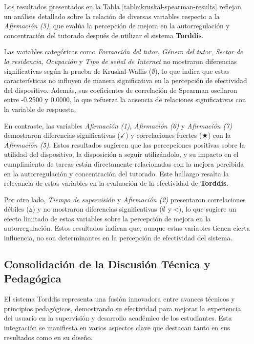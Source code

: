 \documentclass[a4paper,fleqn]{cas-sc}
\begin{document}
				Los resultados presentados en la Tabla \ref{table:kruskal-spearman-results} reflejan un análisis detallado sobre la relación de diversas variables respecto a la \textit{Afirmación (5)}, que evalúa la percepción de mejora en la autorregulación y concentración del tutorado después de utilizar el sistema \textbf{Torddis}.
				
				Las variables categóricas como \textit{Formación del tutor}, \textit{Género del tutor}, \textit{Sector de la residencia}, \textit{Ocupación} y \textit{Tipo de señal de Internet} no mostraron diferencias significativas según la prueba de Kruskal-Wallis (\(\emptyset\)), lo que indica que estas características no influyen de manera significativa en la percepción de efectividad del dispositivo. Además, sus coeficientes de correlación de Spearman oscilaron entre -0.2500 y 0.0000, lo que refuerza la ausencia de relaciones significativas con la variable de respuesta.
				
				En contraste, las variables \textit{Afirmación (1)}, \textit{Afirmación (6)} y \textit{Afirmación (7)} demostraron diferencias significativas (\(\checkmark\)) y correlaciones fuertes (\(\bigstar\)) con la \textit{Afirmación (5)}. Estos resultados sugieren que las percepciones positivas sobre la utilidad del dispositivo, la disposición a seguir utilizándolo, y su impacto en el cumplimiento de tareas están directamente relacionadas con la mejora percibida en la autorregulación y concentración del tutorado. Este hallazgo resalta la relevancia de estas variables en la evaluación de la efectividad de \textbf{Torddis}.
				
				Por otro lado, \textit{Tiempo de supervisión} y \textit{Afirmación (2)} presentaron correlaciones débiles (\(\vartriangle\)) y no mostraron diferencias significativas (\(\emptyset\) y \(\triangleleft\)), lo que sugiere un efecto limitado de estas variables sobre la percepción de mejora en la autorregulación. Estos resultados indican que, aunque estas variables tienen cierta influencia, no son determinantes en la percepción de efectividad del sistema.
		 
		\subsection{Consolidación de la Discusión Técnica y Pedagógica}
			 El sistema Torddis representa una fusión innovadora entre avances técnicos y principios pedagógicos, demostrando su efectividad para mejorar la experiencia del usuario en la supervisión y desarrollo académico de los estudiantes. Esta integración se manifiesta en varios aspectos clave que destacan tanto en sus resultados como en su diseño.
			 
\end{document}
